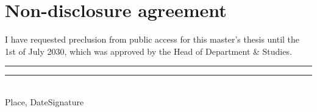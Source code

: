 \label{section:preclusion}
{\section*{\centering Non-disclosure agreement}
\glqq I have requested preclusion from public access for this master's thesis until the 1st of July 2030, which was approved by the Head of Department \& Studies.\grqq\\[5\baselineskip]
\rule{5cm}{0.2pt}\hfill\rule{5cm}{0.2pt}\\
\phantom{Date }Place, Date\hfill Signature\hspace{15mm}}





